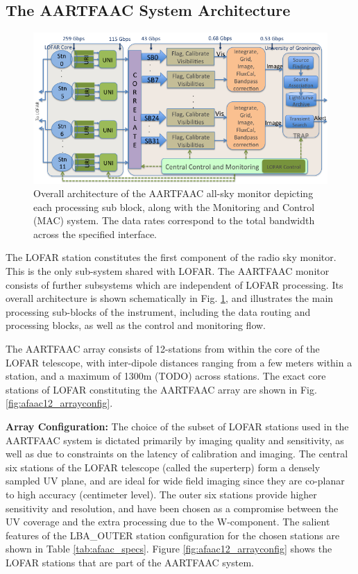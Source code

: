 \documentclass{ws-jai}
\begin{document}
\subsection {\label{subsec:aartfaac}  The AARTFAAC System Architecture}
\begin{figure}[htbp]
\centering
\includegraphics[width=1\textwidth]{Figs/Overall_arch_afaac/Slide1.png}
\caption {Overall  architecture of the  AARTFAAC all-sky monitor  depicting each
  processing sub block, along with the  Monitoring and Control (MAC) system. The
  data rates correspond to the total bandwidth across the specified interface. }
\label{fig:afaac_arch}
\end{figure}

The LOFAR station constitutes the first component of the radio sky monitor. This
is the  only sub-system  shared with  LOFAR.  The  AARTFAAC monitor  consists of
further  subsystems which  are  independent of  LOFAR  processing.  Its  overall
architecture   is  shown   schematically  in   Fig.  \ref{fig:afaac_arch},   and
illustrates the main processing sub-blocks of the instrument, including the data
routing and processing blocks, as well as the control and monitoring flow.

The AARTFAAC  array consists of  12-stations from within  the core of  the LOFAR
telescope,  with inter-dipole  distances  ranging  from a  few  meters within  a
station, and a maximum of 1300m  (TODO) across stations. The exact core stations
of    LOFAR     constituting    the     AARTFAAC    array    are     shown    in
Fig. \ref{fig:afaac12_arrayconfig}.

\noindent  \textbf {Array  Configuration:} The  choice  of the  subset of  LOFAR
stations used  in the AARTFAAC system  is dictated primarily by  imaging quality
and sensitivity, as well as due to constraints on the latency of calibration and
imaging. The central six stations of  the LOFAR telescope (called the superterp)
form a densely sampled UV plane, and are ideal for wide field imaging since they
are  co-planar to  high accuracy  (centimeter  level).  The  outer six  stations
provide higher sensitivity and resolution, and  have been chosen as a compromise
between the  UV coverage and the  extra processing due to  the W-component.  The
salient features of the LBA\_OUTER station configuration for the chosen stations
are     shown     in           Table     \ref{tab:afaac_specs}.      Figure
\ref{fig:afaac12_arrayconfig}  shows the  LOFAR stations  that are  part of  the
AARTFAAC system.
\end{document}

